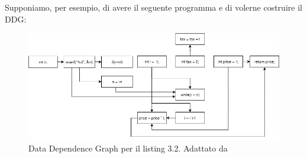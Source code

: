 \documentclass[../main.tex]{subfiles}
\begin{document}
Supponiamo, per esempio, di avere il seguente programma e di volerne costruire il DDG:

\begin{figure}[H]
    \centering
    \includegraphics[width = \linewidth]{../images/DDG.png}
    \caption{Data Dependence Graph per il listing 3.2. Adattato da \cite{DDG}}
\end{figure}
\end{document}
